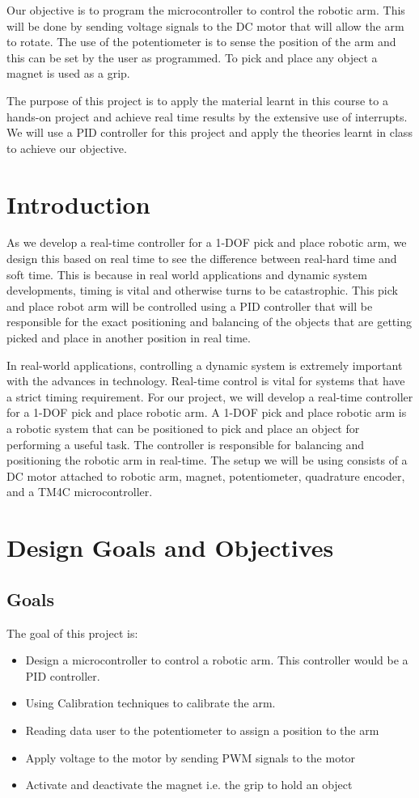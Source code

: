 \documentclass[12pt]{article}
\begin{document}
Our objective is to program the microcontroller to control the robotic arm. This will be done by sending voltage signals to the DC motor that will allow the arm to rotate. The use of the potentiometer is to sense the position of the arm and this can be set by the user as programmed. To pick and place any object a magnet is used as a grip.
 
The purpose of this project is to apply the material learnt in this course to a hands-on project and achieve real time results by the extensive use of interrupts. We will use a PID controller for this project and apply the theories learnt in class to achieve our objective. 

\section{Introduction}
As we develop a real-time controller for a 1-DOF pick and place robotic arm, we design this based on real time to see the difference between real-hard time and soft time. This is because in real world applications and dynamic system developments, timing is vital and otherwise turns to be catastrophic. This pick and place robot arm will be controlled using a PID controller that will be responsible for the exact positioning and balancing of the objects that are getting picked and place in another position in real time. 
 
In real-world applications, controlling a dynamic system is extremely important with the advances in technology. Real-time control is vital for systems that have a strict timing requirement. For our project, we will develop a real-time controller for a 1-DOF pick and place robotic arm. A 1-DOF pick and place robotic arm is a robotic system that can be positioned to pick and place an object for performing a useful task. The controller is responsible for balancing and positioning the robotic arm in real-time. The setup we will be using consists of a DC motor attached to robotic arm, magnet, potentiometer, quadrature encoder, and a TM4C microcontroller.

\section{Design Goals and Objectives}
\subsection{Goals}
The goal of this project is:
\begin{itemize}
    \item Design a microcontroller to control a robotic arm. This controller would be a PID controller.
    \item Using Calibration techniques to calibrate the arm.
    \item Reading data user to the potentiometer to assign a position to the arm
    \item Apply voltage to the motor by sending PWM signals to the motor
    \item Activate and deactivate the magnet i.e. the grip to hold an object
\end{itemize}
\end{document}
